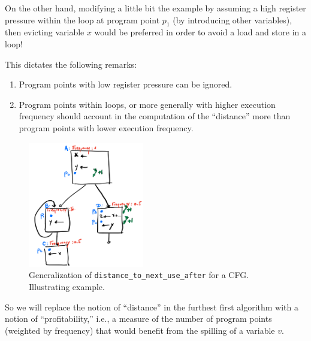 {On the other hand, modifying a little bit the example by assuming a high register pressure within the loop at program point $p_1$ (by introducing other variables), then evicting variable $x$ would be preferred in order to avoid a load and store in a loop!



This dictates the following remarks:
\begin{enumerate}
  \item Program points with low register pressure can be ignored.
  \item Program points within loops, or more generally with higher execution frequency should account in the computation of the ``distance'' more than program points with lower execution frequency.
\end{enumerate}

\begin{figure}
  \includegraphics[width=0.45\textwidth]{figures/priority-spill-CFG.pdf}

  \caption{Generalization of \texttt{distance\_to\_next\_use\_after} for a CFG. Illustrating example.}
  \label{fig:ra:priority-spill-CFG}
\end{figure}

So we will replace the notion of ``distance'' in the furthest first algorithm with a notion of ``profitability,'' i.e., a measure of the number of program points (weighted by frequency) that would benefit from the spilling of a variable $v$.

%
%

}
